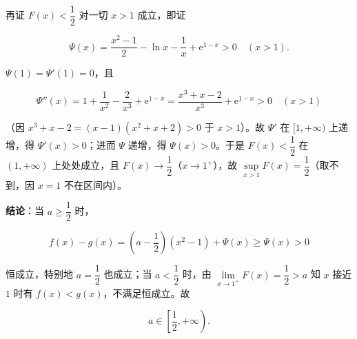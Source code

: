 \begin{answer}
再证 \(F(x)<\dfrac{1}{2}\) 对一切 \(x>1\) 成立，即证

\nopagebreak[4]
\[
\Psi(x)=\frac{x^{2}-1}{2}-\ln x-\frac{1}{x}+\mathrm e^{1-x}>0\quad(x>1).
\]

\(\Psi(1)=\Psi'(1)=0\)，且

\nopagebreak[4]
\[
\Psi''(x)=1+\frac{1}{x^{2}}-\frac{2}{x^{3}}+\mathrm e^{1-x}=\frac{x^{3}+x-2}{x^{3}}+\mathrm e^{1-x}>0\quad(x>1)
\]

（因 \(x^{3}+x-2=(x-1)(x^{2}+x+2)>0\) 于 \(x>1\)）。故 \(\Psi'\) 在 \([1,+\infty)\) 上递增，得 \(\Psi'(x)>0\)；进而 \(\Psi\) 递增，得 \(\Psi(x)>0\)。于是 \(F(x)<\dfrac{1}{2}\) 在 \((1,+\infty)\) 上处处成立，且 \(F(x)\to\dfrac{1}{2}\)（\(x\to1^{+}\)），故 \(\sup\limits_{x>1}F(x)=\dfrac{1}{2}\)（取不到，因 \(x=1\) 不在区间内）。

\textbf{结论}：当 \(a\geqslant\dfrac{1}{2}\) 时，

\nopagebreak[4]
\[
f(x)-g(x)=\left(a-\frac{1}{2}\right)(x^{2}-1)+\Psi(x)\geqslant\Psi(x)>0
\]


恒成立，特别地 \(a=\dfrac{1}{2}\) 也成立；当 \(a<\dfrac{1}{2}\) 时，由 \(\lim\limits_{x\to1^{+}}F(x)=\dfrac{1}{2}>a\) 知 \(x\) 接近 \(1\) 时有 \(f(x)<g(x)\)，不满足恒成立。故

\nopagebreak[4]
\[
a\in\left[\dfrac{1}{2},+\infty\right).
\]



\gkanswer{答案（3）：\(a\in\left[\dfrac{1}{2},+\infty\right)\)（左端闭）。}

\end{answer}